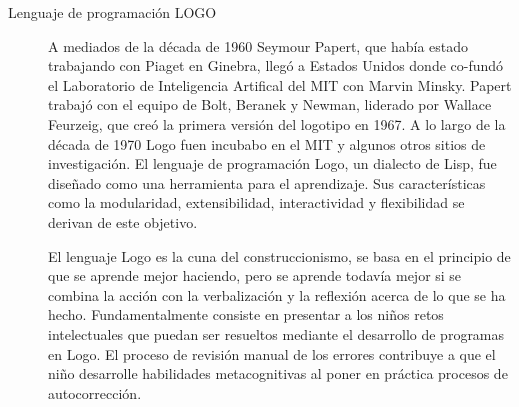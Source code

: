 \begin{description}

\item[Lenguaje de programación LOGO]  A mediados de la década de 1960 Seymour
	Papert, que había estado trabajando con Piaget en Ginebra, llegó a
	Estados Unidos donde co-fundó el Laboratorio de Inteligencia Artifical
	del MIT con Marvin Minsky. Papert trabajó con el equipo de Bolt, Beranek
	y Newman, liderado por Wallace Feurzeig, que creó la primera versión del
	logotipo en 1967. A lo largo de la década de 1970 Logo fuen incubabo en
	el MIT y algunos otros sitios de investigación. El lenguaje de
	programación Logo, un dialecto de Lisp, fue diseñado como una
	herramienta para el aprendizaje. Sus características como la
	modularidad, extensibilidad, interactividad y flexibilidad se derivan de
	este objetivo. 

	El lenguaje Logo es la cuna del construccionismo, se basa en el
	principio de que se aprende mejor haciendo, pero se aprende todavía
	mejor si se combina la acción con la verbalización  y la reflexión
	acerca de lo que se ha hecho. Fundamentalmente consiste en presentar a
	los niños retos intelectuales que puedan ser resueltos mediante el
	desarrollo de programas en Logo. El proceso de revisión manual de los
	errores contribuye a que el niño desarrolle habilidades metacognitivas
	al poner en práctica procesos de autocorrección\cite{logo:sg}.





\end{description}
